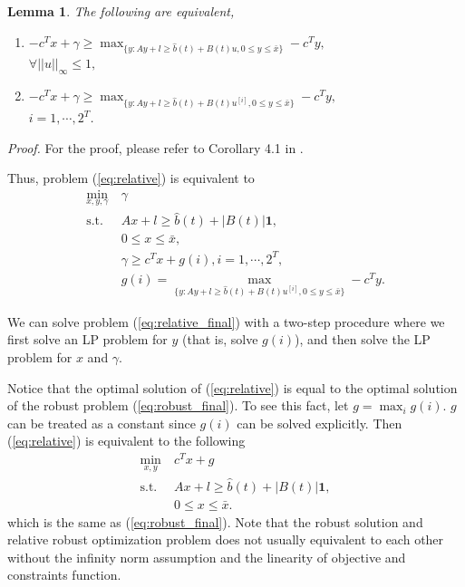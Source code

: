 \documentclass{article}
\newtheorem{lemma}[theorem]{Lemma}
\begin{document}
    \begin{lemma}
        The following are equivalent, 
        \begin{enumerate}
            \item $-c^Tx+\gamma \geq
            \max_{\{y:Ay+l\geq \hat{b}(t)+B(t)u, 0\leq y\leq \bar{x} \}} - c^Ty,$\\ $\forall ||u||_\infty\leq 1,$
            \item $-c^Tx+\gamma \geq
            \max_{\{y:Ay+l\geq \hat{b}(t)+B(t)u^{[i]}, 0\leq y\leq \bar{x} \}} - c^Ty,$\\$ i = 1, \cdots, 2^T$.
        \end{enumerate}
    \end{lemma}
    \emph{Proof. } For the proof, please refer to Corollary 4.1 in \cite{hauser2013relative}.

    Thus, problem (\ref{eq:relative}) is equivalent to 
    \begin{equation}\label{eq:relative_final}\begin{split}
        \min_{x, y, \gamma}\ & \gamma \\
        \text{s.t. } 
        & Ax+l\geq \hat{b}(t) + |B(t)|\textbf{1}, \\
        & 0\leq x\leq \bar{x}, \\
        & \gamma \geq c^Tx + g(i),  i = 1, \cdots, 2^T, \\
        & g(i) = \max_{\{y:Ay+l\geq \hat{b}(t)+B(t)u^{[i]}, 0\leq y\leq \bar{x} \}} - c^Ty.
    \end{split}\end{equation}

    We can solve problem (\ref{eq:relative_final}) with a two-step procedure where we first solve an LP problem for $y$ (that is, solve $g(i)$), and then solve the LP problem for $x$ and $\gamma$.

    Notice that the optimal solution of (\ref{eq:relative}) is equal to the optimal solution of the robust problem (\ref{eq:robust_final}). To see this fact, let $g = \max_i g(i)$. $g$ can be treated as a constant since $g(i)$ can be solved explicitly. Then (\ref{eq:relative}) is equivalent to the following
    \[\begin{split}
        \min_{x, y}\ & c^Tx + g \\
        \text{s.t. } 
        & Ax+l\geq \hat{b}(t) + |B(t)|\textbf{1}, \\
        & 0\leq x\leq \bar{x}.
    \end{split}\]
    which is the same as (\ref{eq:robust_final}). Note that the robust solution and relative robust optimization problem does not usually equivalent to each other without the infinity norm assumption and the linearity of objective and constraints function.
\end{document}
